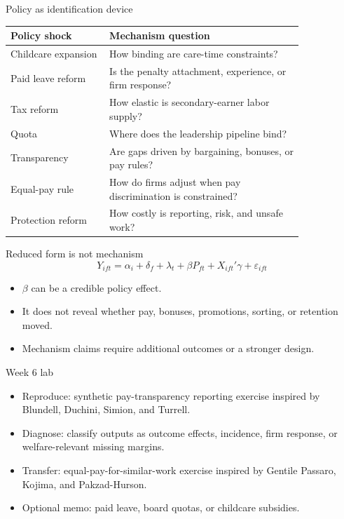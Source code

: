 \documentclass[aspectratio=169,11pt]{beamer}
\begin{document}
\begin{frame}{Policy as identification device}
\small
\begin{tabular}{p{0.28\linewidth} p{0.55\linewidth}}
\toprule
Policy shock & Mechanism question \\
\midrule
Childcare expansion & How binding are care-time constraints? \\
Paid leave reform & Is the penalty attachment, experience, or firm response? \\
Tax reform & How elastic is secondary-earner labor supply? \\
Quota & Where does the leadership pipeline bind? \\
Transparency & Are gaps driven by bargaining, bonuses, or pay rules? \\
Equal-pay rule & How do firms adjust when pay discrimination is constrained? \\
Protection reform & How costly is reporting, risk, and unsafe work? \\
\bottomrule
\end{tabular}
\end{frame}

\begin{frame}{Reduced form is not mechanism}
\[
Y_{ift}=\alpha_i+\delta_f+\lambda_t+\beta P_{ft}+X_{ift}'\gamma+\varepsilon_{ift}
\]
\begin{itemize}
    \item \(\beta\) can be a credible policy effect.
    \item It does not reveal whether pay, bonuses, promotions, sorting, or retention moved.
    \item Mechanism claims require additional outcomes or a stronger design.
\end{itemize}
\end{frame}

\begin{frame}{Week 6 lab}
\begin{itemize}
    \item Reproduce: synthetic pay-transparency reporting exercise inspired by Blundell, Duchini, Simion, and Turrell.
    \item Diagnose: classify outputs as outcome effects, incidence, firm response, or welfare-relevant missing margins.
    \item Transfer: equal-pay-for-similar-work exercise inspired by Gentile Passaro, Kojima, and Pakzad-Hurson.
    \item Optional memo: paid leave, board quotas, or childcare subsidies.
\end{itemize}
\end{frame}
\end{document}
